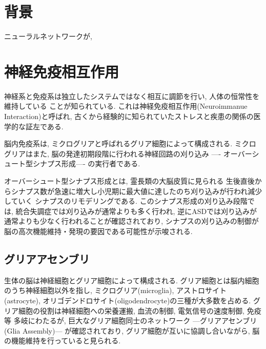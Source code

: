 \documentclass[a4paper,10.5pt,twocolumn]{jsarticle}
\begin{document}


\graphicspath{{./figs/}} %

\section{背景}
ニューラルネットワークが, 
\section{神経免疫相互作用}
神経系と免疫系は独立したシステムではなく相互に調節を行い, 人体の恒常性を維持している
ことが知られている.
これは神経免疫相互作用(Neuroimmanue Interaction)と呼ばれ, 
古くから経験的に知られていたストレスと疾患の関係の医学的な証左である.

脳内免疫系は, ミクログリアと呼ばれるグリア細胞によって構成される.
ミクログリアはまた, 
脳の発達初期段階に行われる神経回路の刈り込み ----
オーバーシュート型シナプス形成---- の実行者である.

オーバーシュート型シナプス形成とは, 霊長類の大脳皮質に見られる
生後直後からシナプス数が急速に増大し小児期に最大値に達したのち刈り込みが行われ減少していく
シナプスのリモデリングである.
このシナプス形成の刈り込み段階では, 統合失調症では刈り込みが通常よりも多く行われ, 
逆にASDでは刈り込みが通常よりも少なく行われることが確認されており, 
シナプスの刈り込みの制御が脳の高次機能維持・発現の要因である可能性が示唆される.
\subsection{グリアアセンブリ}
\label{sec:g-asem}
生体の脳は神経細胞とグリア細胞によって構成される.
グリア細胞とは脳内細胞のうち神経細胞以外を指し, 
ミクログリア(microglia), アストロサイト(astrocyte),
オリゴデンドロサイト(oligodendrocyte)の三種が大多数を占める.
グリア細胞の役割は神経細胞への栄養運搬, 血流の制御, 電気信号の速度制御, 免疫等
多岐にわたるが, 
巨大なグリア細胞同士のネットワーク 
---グリアアセンブリ(Glia Assembly)--- 
が確認されており, グリア細胞が互いに協調し合いながら, 
脳の機能維持を行っていると見られる.
\end{document}
